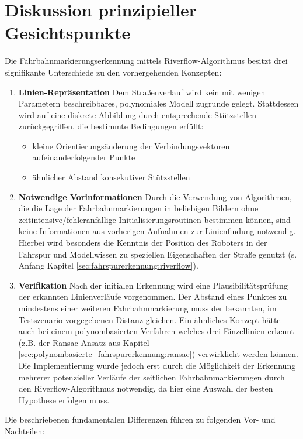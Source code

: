 \section{Diskussion prinzipieller Gesichtspunkte \dcsecondauthorshort} 
Die Fahrbahnmarkierungserkennung mittels Riverflow-Algorithmus besitzt drei signifikante Unterschiede zu den vorhergehenden Konzepten:
\begin{enumerate}
\item \label{item:evaluation:riverflow:no_model}
\textbf{Linien-Repräsentation} Dem Straßenverlauf wird kein mit wenigen Parametern beschreibbares, polynomiales Modell zugrunde gelegt. Stattdessen wird auf eine diskrete Abbildung durch entsprechende Stützstellen zurückgegriffen, die bestimmte Bedingungen erfüllt:
\begin{itemize}
\item kleine Orientierungsänderung der Verbindungsvektoren aufeinanderfolgender Punkte
\item ähnlicher Abstand konsekutiver Stützstellen
\end{itemize}
\item \label{item:evaluation:riverflow:no_old_points_needed}
\textbf{Notwendige Vorinformationen} Durch die Verwendung von Algorithmen, die die Lage der Fahrbahnmarkierungen in beliebigen Bildern ohne zeitintensive/fehleranfällige Initialisierungsroutinen bestimmen können, sind keine Informationen aus vorherigen Aufnahmen zur Linienfindung notwendig. Hierbei wird besonders die Kenntnis der Position des Roboters in der Fahrspur und Modellwissen zu speziellen Eigenschaften der Straße genutzt (s. Anfang Kapitel \ref{sec:fahrspurerkennung:riverflow}).
\item \label{item:evaluation:riverflow:verification}
\textbf{Verifikation} Nach der initialen Erkennung wird eine Plausibilitätsprüfung der erkannten Linienverläufe vorgenommen. Der Abstand eines Punktes zu mindestens einer weiteren Fahrbahnmarkierung muss der bekannten, im Testszenario vorgegebenen Distanz gleichen. Ein ähnliches Konzept hätte auch bei einem polynombasierten Verfahren welches drei Einzellinien erkennt (z.B. der Ransac-Ansatz aus Kapitel \ref{sec:polynombasierte_fahrspurerkennung:ransac}) verwirklicht werden können. Die Implementierung wurde jedoch erst durch die Möglichkeit der Erkennung mehrerer potenzieller Verläufe der seitlichen Fahrbahnmarkierungen durch den Riverflow-Algorithmus notwendig, da hier eine Auswahl der besten Hypothese erfolgen muss.
\end{enumerate}
Die beschriebenen fundamentalen Differenzen führen zu folgenden Vor- und Nachteilen:

